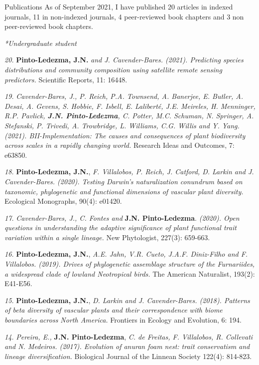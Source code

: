 \documentclass{resume} %
\begin{document}
\begin{rSection}{Publications}
As of September 2021, I have published 20 articles in indexed journals, 11 in non-indexed journals, 4 peer-reviewed book chapters and 3 non peer-reviewed book chapters.

\em{*Undergraduate student}

{\em 20.} {\bf{Pinto-Ledezma, J.N.}} {\em and J. Cavender-Bares. (2021). Predicting species distributions and community composition using satellite remote sensing predictors.} {Scientific Reports, 11: 16448.}

{\em 19.} {\em Cavender-Bares, J., P. Reich, P.A. Townsend, A. Banerjee, E. Butler, A. Desai, A. Gevens, S. Hobbie, F. Isbell, E. Laliberté, J.E. Meireles, H. Menninger, R.P. Pavlick, {\bf{J.N. Pinto-Ledezma}}, C. Potter, M.C. Schuman, N. Springer, A. Stefanski, P. Trivedi, A. Trowbridge, L. Williams, C.G. Willis and Y. Yang. (2021). BII-Implementation: The causes and consequences of plant biodiversity across scales in a rapidly changing world.} {Research Ideas and Outcomes, 7: e63850}. 

{\em 18.} {\bf{Pinto-Ledezma, J.N.}}, {\em F. Villalobos, P. Reich, J. Catford, D. Larkin and J. Cavender-Bares. (2020). Testing Darwin's naturalization conundrum based on taxonomic, phylogenetic and functional dimensions of vascular plant diversity.} {Ecological Monographs, 90(4): e01420}. 

{\em 17.} {\em Cavender-Bares, J., C. Fontes and} {\bf{J.N. Pinto-Ledezma}}. {\em (2020). Open questions in understanding the adaptive significance of plant functional trait variation within a single lineage.} {New Phytologist, 227(3): 659-663}. 

{\em 16.} {\bf{Pinto-Ledezma, J.N.}}, {\em A.E. Jahn, V.R. Cueto, J.A.F. Diniz-Filho and F. Villalobos. (2019). Drives of phylogenetic assemblage structure of the Furnariides, a widespread clade of lowland Neotropical birds.} {The American Naturalist, 193(2): E41-E56}. 

{\em 15.} {\bf{Pinto-Ledezma, J.N.}}, {\em D. Larkin and J. Cavender-Bares. (2018). Patterns of beta diversity of vascular plants and their correspondence with biome boundaries across North America.} {Frontiers in Ecology and Evolution, 6: 194}.

{\em 14.} {\em Pereira, E.,} {\bf{J.N. Pinto-Ledezma}}, {\em C. de Freitas, F. Villalobos, R. Collevati and N. Medeiros. (2017). Evolution of anuran foam nest: trait conservatism and lineage diversification.} {Biological Journal of the Linnean Society 122(4): 814-823}. 


\end{rSection}
\end{document}
